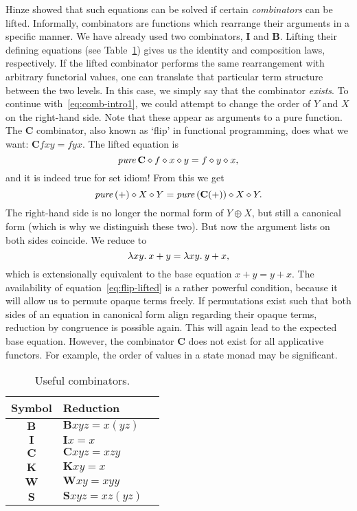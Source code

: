 Hinze showed that such equations can be solved if certain \emph{combinators}
can be lifted.
Informally, combinators are functions which rearrange their arguments in a
specific manner.
We have already used two combinators, $\mathbf{I}$ and $\mathbf{B}$.
Lifting their defining equations (see Table~\ref{tab:combinators}) gives us
the identity and composition laws, respectively.
If the lifted combinator performs the same rearrangement with arbitrary
functorial values, one can translate that particular term structure between the
two levels.
In this case, we simply say that the combinator \emph{exists}.
To continue with~\eqref{eq:comb-intro1}, we could attempt to change the order of
$Y$ and $X$ on the right-hand side.
Note that these appear as arguments to a pure function.
The $\mathbf{C}$ combinator, also known as `flip' in functional programming,
does what we want: $\mathbf{C}fxy = fyx$.
The lifted equation is
\begin{equation}\label{eq:flip-lifted}
	\operatorname{\mathit{pure}} \mathbf{C} \diamond f \diamond x \diamond y = f \diamond y \diamond x,
\end{equation}
and it is indeed true for set idiom!
From this we get
\begin{equation}\label{eq:comb-intro2}
	\operatorname{\mathit{pure}}{(+)} \diamond X \diamond Y = \operatorname{\mathit{pure}}{(\mathbf{C}(+))} \diamond X \diamond Y.
\end{equation}
The right-hand side is no longer the normal form of $Y \oplus X$, but still
a canonical form (which is why we distinguish these two).
But now the argument lists on both sides coincide.
We reduce to
\[ \lambda xy.\>x + y = \lambda xy.\>y + x, \]
which is extensionally equivalent to the base equation $x + y = y + x$.
The availability of equation~\eqref{eq:flip-lifted} is a rather powerful
condition, because it will allow us to permute opaque terms freely.
If permutations exist such that both sides of an equation in canonical form
align regarding their opaque terms, reduction by congruence is possible again.
This will again lead to the expected base equation.
However, the combinator $\mathbf{C}$ does not exist for all applicative functors.
For example, the order of values in a state monad may be significant.

\begin{table}\centering
\begin{tabular}{cll}
Symbol & Reduction \\
\hline
$\mathbf{B}$ & $\mathbf{B} x y z = x (y z)$ \\
$\mathbf{I}$ & $\mathbf{I} x = x$ \\
$\mathbf{C}$ & $\mathbf{C} x y z = x z y$ \\
$\mathbf{K}$ & $\mathbf{K} x y = x$ \\
$\mathbf{W}$ & $\mathbf{W} x y = x y y$ \\
$\mathbf{S}$ & $\mathbf{S} x y z = x z (y z)$ \\
\end{tabular}
\caption{Useful combinators.}
\label{tab:combinators}
\end{table}

